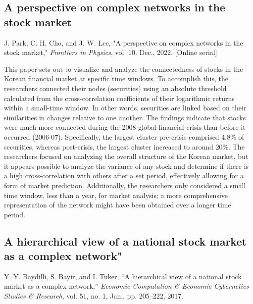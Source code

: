 \documentclass[12pt]{article}
\begin{document}
\subsection{A perspective on complex networks in the stock market}
J. Park, C. H. Cho, and J. W. Lee, "A perspective on complex networks in the stock market," \textit{Frontiers in Physics}, vol. 10. Dec., 2022. [Online serial] %
\newline

This paper sets out to visualize and analyze the connectedness of stocks in the Korean financial market at specific time windows. To accomplish this, the researchers connected their nodes (securities) using an absolute threshold calculated from the cross-correlation coefficients of their logarithmic returns within a small-time window. In other words, securities are linked based on their similarities in changes relative to one another. The findings indicate that stocks were much more connected during the 2008 global financial crisis than before it occurred (2006-07). Specifically, the largest cluster pre-crisis comprised 4.8\% of securities, whereas post-crisis, the largest cluster increased to around 20\%. The researchers focused on analyzing the overall structure of the Korean market, but it appears possible to analyze the variance of any stock and determine if there is a high cross-correlation with others after a set period, effectively allowing for a form of market prediction. Additionally, the researchers only considered a small time window, less than a year, for market analysis; a more comprehensive representation of the network might have been obtained over a longer time period.


\subsection{A hierarchical view of a national stock market as a complex network"}
Y. Y. Baydilli, S. Bayir, and I. Tuker, “A hierarchical view of a national stock market as a complex network,” \textit{Economic Computation \& Economic Cybernetics Studies \& Research}, vol. 51, no. 1, Jan., pp. 205–222, 2017.
\newline
\end{document}
